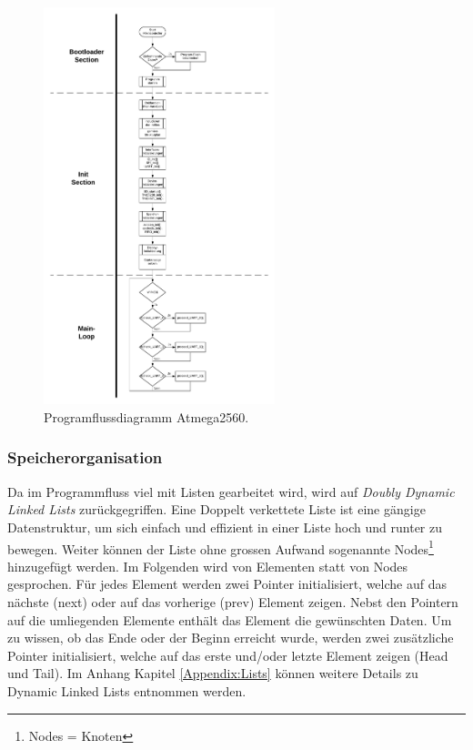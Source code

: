 \newpage

\begin{figure}[h!]
	\centering
	\includegraphics[width=0.6\textwidth]{graphics/Programmfluss_Atmega2560.pdf}
	\caption{Programflussdiagramm Atmega2560.}
	\label{fig:Programmfluss_Atmega2560}
\end{figure}
\newpage


\subsubsection{Speicherorganisation}\label{subsubsec:Speicherorganisation}

Da im Programmfluss viel mit Listen gearbeitet wird, wird auf \textit{Doubly Dynamic Linked Lists} zurückgegriffen.
Eine Doppelt verkettete Liste ist eine gängige Datenstruktur, um sich einfach und effizient in einer Liste hoch und runter zu bewegen. Weiter können der Liste ohne grossen Aufwand sogenannte Nodes\footnote{Nodes = Knoten} hinzugefügt werden. Im Folgenden wird von Elementen statt von Nodes gesprochen. Für jedes Element werden zwei Pointer initialisiert, welche auf das nächste (next) oder auf das vorherige (prev) Element zeigen. Nebst den Pointern auf die umliegenden Elemente enthält das Element die gewünschten Daten. Um zu wissen, ob das Ende oder der Beginn erreicht wurde, werden zwei zusätzliche Pointer initialisiert, welche auf das erste und/oder letzte Element zeigen (Head und Tail). Im Anhang Kapitel \ref{Appendix:Lists} können weitere Details zu Dynamic Linked Lists entnommen werden.\cite{lenz_artikel_2016}


